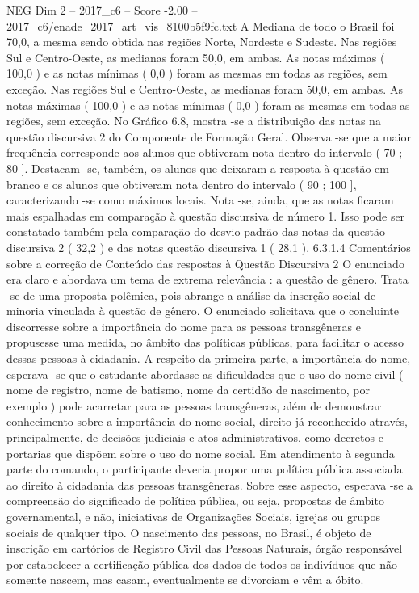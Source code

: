 \begin{textsample}{NEG Dim 2 – 2017\_c6 – Score -2.00 – 2017\_c6/enade\_2017\_art\_vis\_8100b5f9fc.txt}
A Mediana de todo o Brasil foi 70,0, a mesma sendo obtida nas regiões Norte, Nordeste e Sudeste.
Nas regiões Sul e Centro-Oeste, as medianas foram 50,0, em ambas.
As notas máximas ( 100,0 ) e as notas mínimas ( 0,0 ) foram as mesmas em todas as regiões, sem exceção.
Nas regiões Sul e Centro-Oeste, as medianas foram 50,0, em ambas.
As notas máximas ( 100,0 ) e as notas mínimas ( 0,0 ) foram as mesmas em todas as regiões, sem exceção.
No Gráfico 6.8, mostra -se a distribuição das notas na questão discursiva 2 do Componente de Formação Geral.
Observa -se que a maior frequência corresponde aos alunos que obtiveram nota dentro do intervalo ( 70 ; 80 ].
Destacam -se, também, os alunos que deixaram a resposta à questão em branco e os alunos que obtiveram nota dentro do intervalo ( 90 ; 100 ], caracterizando -se como máximos locais.
Nota -se, ainda, que as notas ficaram mais espalhadas em comparação à questão discursiva de número 1.
Isso pode ser constatado também pela comparação do desvio padrão das notas da questão discursiva 2 ( 32,2 ) e das notas questão discursiva 1 ( 28,1 ). 6.3.1.4 Comentários sobre a correção de Conteúdo das respostas à Questão Discursiva 2 O enunciado era claro e abordava um tema de extrema relevância : a questão de gênero.
Trata -se de uma proposta polêmica, pois abrange a análise da inserção social de minoria vinculada à questão de gênero.
O enunciado solicitava que o concluinte discorresse sobre a importância do nome para as pessoas transgêneras e propusesse uma medida, no âmbito das políticas públicas, para facilitar o acesso dessas pessoas à cidadania.
A respeito da primeira parte, a importância do nome, esperava -se que o estudante abordasse as dificuldades que o uso do nome civil ( nome de registro, nome de batismo, nome da certidão de nascimento, por exemplo ) pode acarretar para as pessoas transgêneras, além de demonstrar conhecimento sobre a importância do nome social, direito já reconhecido através, principalmente, de decisões judiciais e atos administrativos, como decretos e portarias que dispõem sobre o uso do nome social.
Em atendimento à segunda parte do comando, o participante deveria propor uma política pública associada ao direito à cidadania das pessoas transgêneras.
Sobre esse aspecto, esperava -se a compreensão do significado de política pública, ou seja, propostas de âmbito governamental, e não, iniciativas de Organizações Sociais, igrejas ou grupos sociais de qualquer tipo.
O nascimento das pessoas, no Brasil, é objeto de inscrição em cartórios de Registro Civil das Pessoas Naturais, órgão responsável por estabelecer a certificação pública dos dados de todos os indivíduos que não somente nascem, mas casam, eventualmente se divorciam e vêm a óbito.

\end{textsample}
